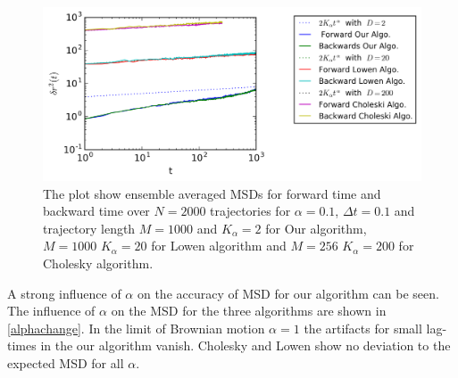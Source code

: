 \documentclass[
  a4paper,BCOR10mm,oneside,
  bibtotoc,idxtotoc,
  headsepline,footsepline,%
  fleqn,openbib
]{scrbook}
\begin{document}
\begin{figure}[h!]
\centering
\includegraphics[width=\textwidth]{./data/changeintime.png}
\caption{The plot show ensemble averaged MSDs for forward time and backward time over $N=2000$ trajectories for $\alpha =0.1$, $\Delta t = 0.1$ and trajectory length $M=1000$ and $K_{\alpha}=2$ for Our algorithm, $M=1000$  $K_{\alpha}=20 $ for Lowen algorithm and  $M=256$  $K_{\alpha}=200$ for Cholesky algorithm.}
\label{changeintime}
\end{figure} 
A strong influence of $\alpha$ on the accuracy of MSD for our algorithm can be seen. The influence of $\alpha$ on the MSD for the three algorithms are shown in \cref{alphachange}. In the limit of Brownian motion $\alpha=1$ the artifacts for small lag-times in the our algorithm vanish. Cholesky and Lowen show no deviation to the expected MSD for all $\alpha$.
\end{document}
